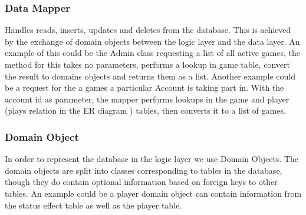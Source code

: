\subsubsection{Data Mapper} \label{sec:dbImplementation}
Handles reads, inserts, updates and deletes from the database. This is achieved by the exchange of domain objects between the logic layer and the data layer.
An example of this could be the Admin class requesting a list of all active games, the method for this takes no parameters, performs a lookup in game table, convert the result to domains objects and returns them as a list.
Another example could be a request for the a games a particular Account is taking part in. With the account id as parameter, the mapper performs lookups in the game and player (plays relation in the ER diagram ) tables, then converts it to a list of games.


\subsubsection{Domain Object} 
In order to represent the database in the logic layer we use Domain Objects. The domain objects are split into classes corresponding to tables in the database, though they do contain optional information based on foreign keys to other tables. An example could be a player domain object can contain information from the status effect table as well as the player table.
